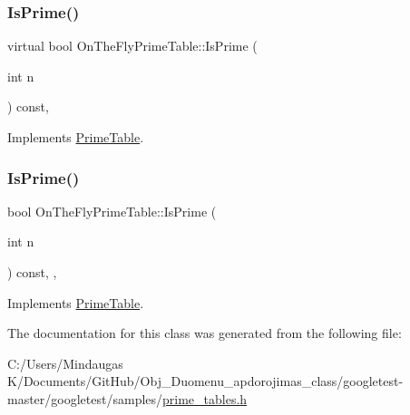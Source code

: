 \subsubsection{\texorpdfstring{IsPrime()}{IsPrime()}\hspace{0.1cm}{\footnotesize\ttfamily [2/3]}}
{\footnotesize\ttfamily virtual bool On\+The\+Fly\+Prime\+Table\+::\+Is\+Prime (\begin{DoxyParamCaption}\item[{int}]{n }\end{DoxyParamCaption}) const\hspace{0.3cm}{\ttfamily [inline]}, {\ttfamily [virtual]}}



Implements \mbox{\hyperlink{class_prime_table_a2ab9243364ded0c51541f641b2df362a}{Prime\+Table}}.

\mbox{\label{class_on_the_fly_prime_table_ac8236514299e4558a5220c3e06f7f61a}} 
\subsubsection{\texorpdfstring{IsPrime()}{IsPrime()}\hspace{0.1cm}{\footnotesize\ttfamily [3/3]}}
{\footnotesize\ttfamily bool On\+The\+Fly\+Prime\+Table\+::\+Is\+Prime (\begin{DoxyParamCaption}\item[{int}]{n }\end{DoxyParamCaption}) const\hspace{0.3cm}{\ttfamily [inline]}, {\ttfamily [override]}, {\ttfamily [virtual]}}



Implements \mbox{\hyperlink{class_prime_table_a2ab9243364ded0c51541f641b2df362a}{Prime\+Table}}.



The documentation for this class was generated from the following file\+:\begin{DoxyCompactItemize}
\item 
C\+:/\+Users/\+Mindaugas K/\+Documents/\+Git\+Hub/\+Obj\+\_\+\+Duomenu\+\_\+apdorojimas\+\_\+class/googletest-\/master/googletest/samples/\mbox{\hyperlink{googletest-master_2googletest_2samples_2prime__tables_8h}{prime\+\_\+tables.\+h}}\end{DoxyCompactItemize}

